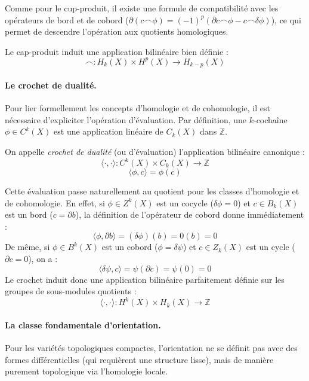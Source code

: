Comme pour le cup-produit, il existe une formule de compatibilité avec les opérateurs de bord et de cobord ($\partial(c \frown \phi) = (-1)^p (\partial c \frown \phi - c \frown \delta \phi)$), ce qui permet de descendre l'opération aux quotients homologiques.

\begin{definition}
Le cap-produit induit une application bilinéaire bien définie :
\[
\frown : H_k(X) \times H^p(X) \longrightarrow H_{k-p}(X)
\]
\end{definition}


\paragraph{Le crochet de dualité.}

Pour lier formellement les concepts d'homologie et de cohomologie, il est nécessaire d'expliciter l'opération d'évaluation. Par définition, une $k$-cochaîne $\phi \in C^k(X)$ est une application linéaire de $C_k(X)$ dans $\mathbb{Z}$. 

\begin{definition}
On appelle \emph{crochet de dualité} (ou d'évaluation) l'application bilinéaire canonique :
\[
\langle \cdot, \cdot \rangle : C^k(X) \times C_k(X) \longrightarrow \mathbb{Z}
\]
\[
\langle \phi, c \rangle = \phi(c)
\]
\end{definition}

Cette évaluation passe naturellement au quotient pour les classes d'homologie et de cohomologie. En effet, si $\phi \in Z^k(X)$ est un cocycle ($\delta\phi = 0$) et $c \in B_k(X)$ est un bord ($c = \partial b$), la définition de l'opérateur de cobord donne immédiatement :
\[
\langle \phi, \partial b \rangle = (\delta \phi)(b) = 0(b) = 0
\]
De même, si $\phi \in B^k(X)$ est un cobord ($\phi = \delta \psi$) et $c \in Z_k(X)$ est un cycle ($\partial c = 0$), on a :
\[
\langle \delta \psi, c \rangle = \psi(\partial c) = \psi(0) = 0
\]
Le crochet induit donc une application bilinéaire parfaitement définie sur les groupes de sous-modules quotients :
\[
\langle \cdot, \cdot \rangle : H^k(X) \times H_k(X) \longrightarrow \mathbb{Z}
\]

\paragraph{La classe fondamentale d'orientation.}

Pour les variétés topologiques compactes, l'orientation ne se définit pas avec des formes différentielles (qui requièrent une structure lisse), mais de manière purement topologique via l'homologie locale. 

